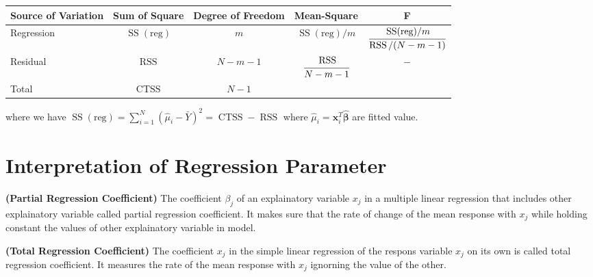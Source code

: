 \begin{remark}
\begin{table}[H]
    \centering
    \begin{tabular}{lcccc}
        \toprule
        \textbf{Source of Variation} & \textbf{Sum of Square} & \textbf{Degree of Freedom} &  \textbf{Mean-Square}  & \textbf{F} \\
        \midrule
        Regression & $\operatorname{SS}(\text{reg})$ & $m$ & $\operatorname{SS}(\text{reg})/m$ & $\cfrac{\operatorname{SS}(\text{reg})/m}{\operatorname{RSS}/(N-m-1)}$ \\
        Residual & $\operatorname{RSS}$ & $N-m-1$ & $\cfrac{\operatorname{RSS}}{N-m-1}$ & $-$ \\
        \midrule
        Total & $\text{CTSS}$ & $N-1$ \\
        \bottomrule
    \end{tabular}
    \end{table}
    where we have $\operatorname{SS}(\text{reg}) = \sum^N_{i=1}(\hat{\mu}_i - \bar{Y})^2 = \operatorname{CTSS} - \operatorname{RSS}$ where $\hat{\mu}_i = \boldsymbol x_i^T\hat{\boldsymbol \beta}$ are fitted value. 
\end{remark}

\section{Interpretation of Regression Parameter}
\begin{remark}{\textbf{(Partial Regression Coefficient)}}
    The coefficient $\beta_j$ of an explainatory variable $x_j$ in a multiple linear regression that includes other explainatory variable called partial regression coefficient. It makes sure that the rate of change of the mean response with $x_j$ while holding constant the values of other explainatory variable in model. 
\end{remark}

\begin{remark}{\textbf{(Total Regression Coefficient)}}
    The coefficient $x_j$ in the simple linear regression of the respons variable $x_j$ on its own is called total regression coefficient. It measures the rate of the mean response with $x_j$ ignorning the value of the other. 
\end{remark}

